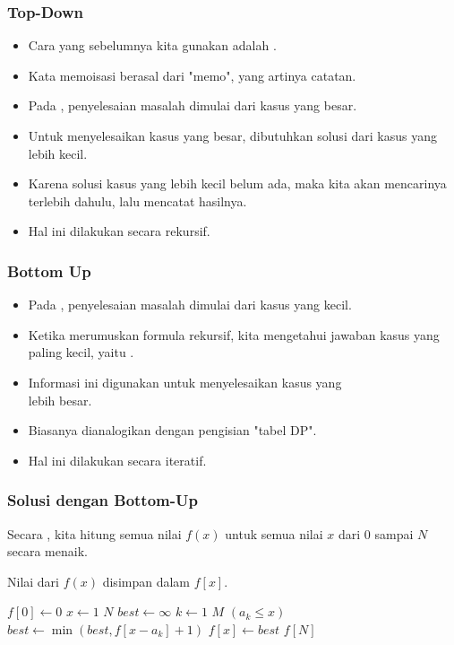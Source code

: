 \begin{frame} 
\frametitle{Top-Down}
\begin{itemize}
  \item Cara yang sebelumnya kita gunakan adalah \ftopdown.
  \item Kata memoisasi berasal dari "memo", yang artinya catatan.
  \item Pada \ftopdown, penyelesaian masalah dimulai dari kasus yang besar.
  \item Untuk menyelesaikan kasus yang besar, dibutuhkan solusi dari kasus yang lebih kecil.
  \item Karena solusi kasus yang lebih kecil belum ada, maka kita akan mencarinya terlebih dahulu, lalu mencatat hasilnya.
  \item Hal ini dilakukan secara rekursif.
\end{itemize}
\end{frame}

\begin{frame} 
\frametitle{Bottom Up}
\begin{itemize}
  \item Pada \fbottomup, penyelesaian masalah dimulai dari kasus yang kecil.
  \item Ketika merumuskan formula rekursif, kita mengetahui jawaban kasus yang paling kecil, yaitu \fbasecase.
  \item Informasi ini digunakan untuk menyelesaikan kasus yang \\ lebih besar.
  \item Biasanya dianalogikan dengan pengisian "tabel DP".
  \item Hal ini dilakukan secara iteratif.
\end{itemize}
\end{frame}

\begin{frame}
\frametitle{Solusi dengan Bottom-Up}
Secara \fbottomup, kita hitung semua nilai $f(x)$ untuk \newline semua nilai $x$ dari $0$ sampai $N$ secara menaik.

Nilai dari $f(x)$ disimpan dalam \farray $f[x]$.
\begin{codebox}
\li $f[0] \gets 0$
\li \For $x \gets 1$ \To $N$ \Do
\li   $best \gets \infty$
\li   \For $k \gets 1$ \To $M$ \Do
\li     \If $(a_k \leq x)$ \Then
\li       $best \gets \min(best, f[x - a_k] + 1)$
        \End
      \End
\li   $f[x] \gets best$
    \End
\li \Return $f[N]$
\end{codebox}
\end{frame}

